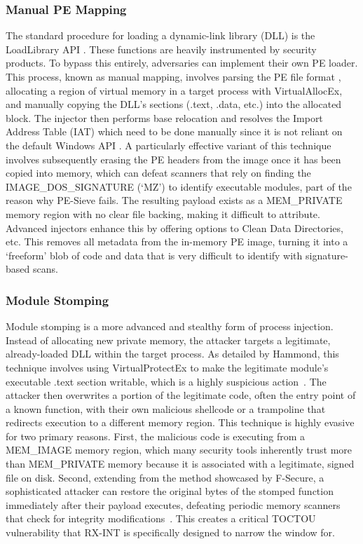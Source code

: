 \documentclass[journal]{IEEEtran}
\begin{document}
\subsubsection{Manual PE Mapping}
The standard procedure for loading a dynamic-link library (DLL) is the LoadLibrary API \cite{microsoftDLLs}. These functions are heavily instrumented by security products. To bypass this entirely, adversaries can implement their own PE loader. This process, known as manual mapping, involves parsing the PE file format \cite{fewer2008reflective}, allocating a region of virtual memory in a target process with VirtualAllocEx, and manually copying the DLL's sections (.text, .data, etc.) into the allocated block. The injector then performs base relocation and resolves the Import Address Table (IAT) which need to be done manually since it is not reliant on the default Windows API \cite{IredTeamModuleStomping}. A particularly effective variant of this technique involves subsequently erasing the PE headers from the image once it has been copied into memory, which can defeat scanners that rely on finding the IMAGE\_DOS\_SIGNATURE (`MZ') to identify executable modules, part of the reason why PE-Sieve fails. The resulting payload exists as a MEM\_PRIVATE memory region with no clear file backing, making it difficult to attribute. Advanced injectors enhance this by offering options to Clean Data Directories, etc. This removes all metadata from the in-memory PE image, turning it into a `freeform' blob of code and data that is very difficult to identify with signature-based scans.
\subsubsection{Module Stomping}
Module stomping is a more advanced and stealthy form of process injection. Instead of allocating new private memory, the attacker targets a legitimate, already-loaded DLL within the target process. As detailed by Hammond, this technique involves using VirtualProtectEx \cite{microsoftVirtualProtectEx} to make the legitimate module's executable .text section writable, which is a highly suspicious action~\cite{Orr2019}. The attacker then overwrites a portion of the legitimate code, often the entry point of a known function, with their own malicious shellcode or a trampoline that redirects execution to a different memory region.
This technique is highly evasive for two primary reasons. First, the malicious code is executing from a MEM\_IMAGE memory region, which many security tools inherently trust more than MEM\_PRIVATE memory because it is associated with a legitimate, signed file on disk. Second, extending from the method showcased by F-Secure, a sophisticated attacker can restore the original bytes of the stomped function immediately after their payload executes, defeating periodic memory scanners that check for integrity modifications~\cite{Orr2019}. This creates a critical TOCTOU vulnerability that RX-INT is specifically designed to narrow the window for.
\end{document}
